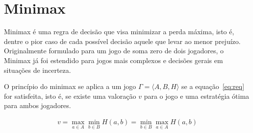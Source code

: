 \chapter{Minimax}

Minimax é uma regra de decisão que visa minimizar a perda máxima, isto é, dentre
o pior caso de cada possível decisão aquele que levar ao menor prejuízo.
Originalmente formulado para um jogo de soma zero de dois jogadores, o Minimax
já foi estendido para jogos mais complexos e decisões gerais em situações de
incerteza.

O princípio do minimax se aplica a um jogo $\Gamma=\langle A,B,H\rangle$ se a
equação~\ref{eq:req} for satisfeita, isto é, se existe uma valoração $v$ para o
jogo e uma estratégia ótima para ambos jogadores.
\cite{hazewinkel2002encyclopaedia}

\begin{gather}
  v=\max_{a\in A}\min_{b\in B}H(a,b)=\min_{b\in B}\max_{a\in A}H(a,b)\label{eq:req}
\end{gather}


